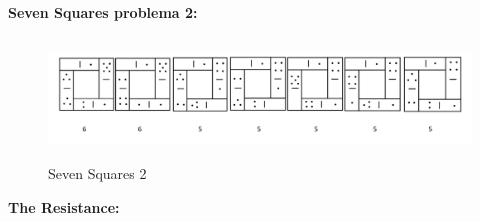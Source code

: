 \pagebreak
\newpage
\textbf{Seven Squares problema 2:}\newline\newline
\inputminted[linenos]{python}{code/ss2.out}\newline\newline\newline\newline\newline\newline\newline\newline
\newline\newline
\begin{figure}[h]
    \centering
    \includegraphics[width=16cm]{text/images/pic9.png}\\
    \caption{Seven Squares 2}
\end{figure} 
\newline\pagebreak


\textbf{The Resistance:}\newline\newline
\inputminted[linenos]{python}{code/spy.out}

